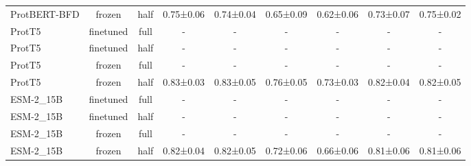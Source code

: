 \begin{tabular}{lcccccccc}
ProtBERT-BFD &         frozen &      half & 0.75±0.06 & 0.74±0.04 & 0.65±0.09 & 0.62±0.06 & 0.73±0.07 & 0.75±0.02 \\
      ProtT5 &      finetuned &      full &         - &         - &         - &         - &         - &         - \\
      ProtT5 &      finetuned &      half &         - &         - &         - &         - &         - &         - \\
      ProtT5 &         frozen &      full &         - &         - &         - &         - &         - &         - \\
      ProtT5 &         frozen &      half & 0.83±0.03 & 0.83±0.05 & 0.76±0.05 & 0.73±0.03 & 0.82±0.04 & 0.82±0.05 \\
   ESM-2\_15B &      finetuned &      full &         - &         - &         - &         - &         - &         - \\
   ESM-2\_15B &      finetuned &      half &         - &         - &         - &         - &         - &         - \\
   ESM-2\_15B &         frozen &      full &         - &         - &         - &         - &         - &         - \\
   ESM-2\_15B &         frozen &      half & 0.82±0.04 & 0.82±0.05 & 0.72±0.06 & 0.66±0.06 & 0.81±0.06 & 0.81±0.06 \\
\bottomrule
\end{tabular}
